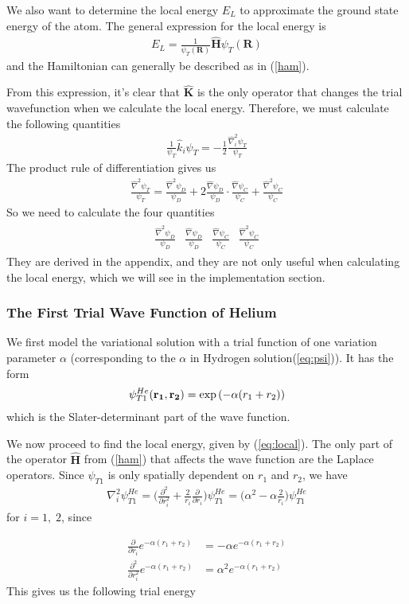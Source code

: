 \documentclass[twocolumns, a4paper,11pt,fleqn]{extarticle}
\newcommand{\eq}[1]{{\small\begin{align*}#1\end{align*}}}
\newcommand{\mat}[1]{\begin{matrix}#1\end{matrix}}
\renewcommand\vec[1]{\boldsymbol{\mathbf{#1}}}
\newcommand{\OP}[1]{\mathbf{\widehat{#1}}}
\newcommand{\op}[1]{\hat{#1}}
\begin{document}
We also want to determine the local energy $E_L$ to approximate
the ground state energy of the atom.
The general expression for the local energy is
\eq{
  E_L = \frac{1}{\psi_T (\vec R)}\OP H \psi_T (\vec R) 
}
and the Hamiltonian can generally be described as in (\ref{ham}).

From this expression, it's clear that $\OP K$ is the only operator that changes the
trial wavefunction when we calculate the local energy. Therefore, we must calculate the
following quantities
\eq{
  \frac{1}{\psi_T}\op k_i \psi_T = -\frac{1}{2}\frac{\op\nabla_i^2 \psi_T}{\psi_T}
}
The product rule of differentiation gives us
\eq{
  \frac{\op\nabla^2 \psi_T}{\psi_T} = 
  \frac{\op\nabla^2 \psi_D}{\psi_D}
    +2 \frac{\op\nabla \psi_D}{\psi_D}\cdot\frac{\op\nabla \psi_C}{\psi_C}
    +\frac{\op\nabla^2 \psi_C}{\psi_C}
}
So we need to calculate the four quantities
\eq{\mat{
  \frac{\op\nabla^2 \psi_D}{\psi_D}&
    \frac{\op\nabla \psi_D}{\psi_D}&
    \frac{\op\nabla \psi_C}{\psi_C}&
    \frac{\op\nabla^2 \psi_C}{\psi_C}
}}
They are derived in the appendix, and they are not only useful when calculating the
local energy, which we will see in the implementation section.

\subsubsection{The First Trial Wave Function of Helium}
We first model the variational solution with a trial function of one
variation parameter $\alpha$ 
(corresponding to the $\alpha$ in Hydrogen solution(\ref{eq:psi})).
It has the form
\eq{
\psi_{T1}^{He}({\bf r_1},{\bf r_2}) = 
   \exp{\left(-\alpha(r_1+r_2)\right)}
}
which is the Slater-determinant part of the wave function.

We now proceed to find the local energy, given by (\ref{eq:local}).
The only part of the operator $\OP H$ from (\ref{ham}) that affects the wave function
are the Laplace operators.
Since $\psi_{T1}$ is only spatially dependent on $r_1$ and $r_2$, we have
\eq{
  \nabla_i^2 \psi_{T1}^{He} = \bigg( \frac{\partial^2}{\partial r_i^2} 
    + \frac{2}{r_i} \frac{\partial}{\partial r_i} \bigg) \psi_{T1}^{He}
    = \bigg( \alpha^2 -\alpha\frac{2}{r_i}  \bigg)\psi_{T1}^{He}
}
for $i = 1,\;2$, since

\eq{
  \frac{\partial}{\partial r_i} e^{-\alpha (r_1+r_2)}
    &= -\alpha e^{-\alpha (r_1+r_2)}\\
\frac{\partial^2}{\partial r_i^2} e^{-\alpha (r_1+r_2)}
    &= \alpha^2 e^{-\alpha (r_1+r_2)}
}
This gives us the following trial energy
\end{document}
